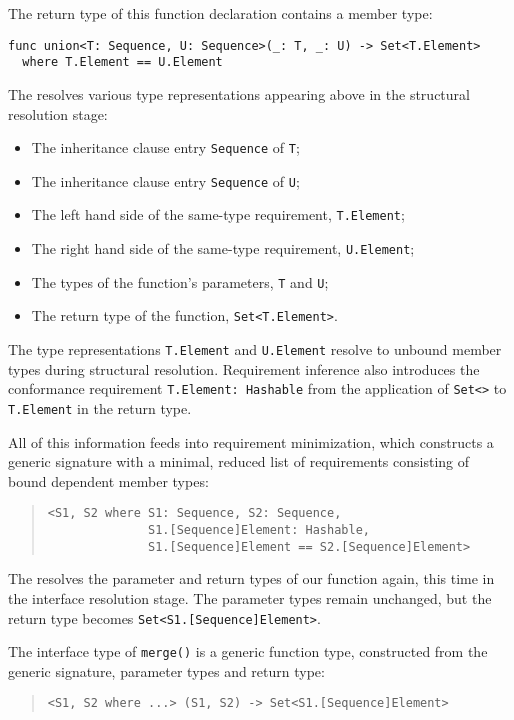 \documentclass[../generics]{subfiles}
\begin{document}
\begin{example}
The return type of this function declaration contains a member type:
\begin{Verbatim}
func union<T: Sequence, U: Sequence>(_: T, _: U) -> Set<T.Element>
  where T.Element == U.Element
\end{Verbatim}
The  resolves various type representations appearing above in the structural resolution stage:
\begin{itemize}
\item The inheritance clause entry \texttt{Sequence} of \texttt{T};
\item The inheritance clause entry \texttt{Sequence} of \texttt{U};
\item The left hand side of the same-type requirement, \texttt{T.Element};
\item The right hand side of the same-type requirement, \texttt{U.Element};
\item The types of the function's parameters, \texttt{T} and \texttt{U};
\item The return type of the function, \texttt{Set<T.Element>}.
\end{itemize}
The type representations \texttt{T.Element} and \texttt{U.Element} resolve to unbound member types during structural resolution. Requirement inference also introduces the conformance requirement \verb|T.Element: Hashable| from the application of \texttt{Set<>} to \texttt{T.Element} in the return type.

All of this information feeds into requirement minimization, which constructs a generic signature with a minimal, reduced list of requirements consisting of bound dependent member types:
\begin{quote}
\begin{verbatim}
<S1, S2 where S1: Sequence, S2: Sequence,
              S1.[Sequence]Element: Hashable,
              S1.[Sequence]Element == S2.[Sequence]Element>
\end{verbatim}
\end{quote}
The  resolves the parameter and return types of our function again, this time in the interface resolution stage. The parameter types remain unchanged, but the return type becomes \texttt{Set<S1.[Sequence]Element>}.

The interface type of \texttt{merge()} is a generic function type, constructed from the generic signature, parameter types and return type:
\begin{quote}
\begin{verbatim}
<S1, S2 where ...> (S1, S2) -> Set<S1.[Sequence]Element>
\end{verbatim}
\end{quote}
\end{example}
\end{document}

